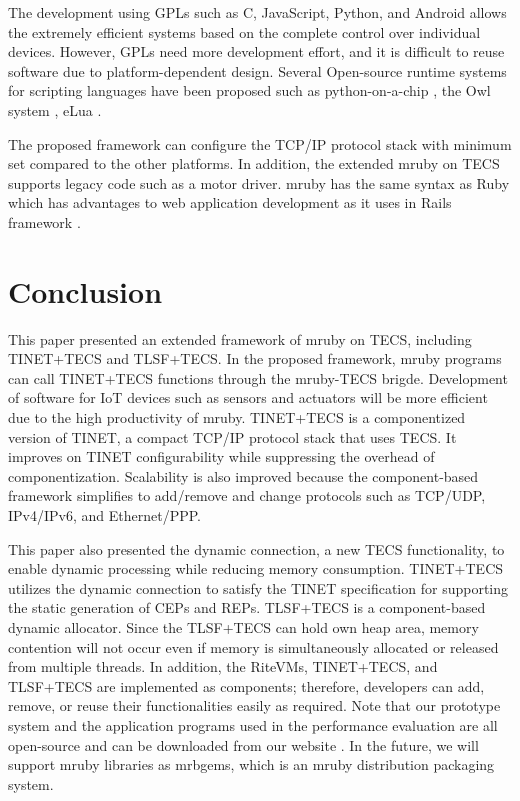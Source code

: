 \documentclass[JIP]{ipsj_v2/UTF8/ipsj}
\begin{document}
The development using GPLs such as C, JavaScript, Python, and Android allows the extremely efficient systems based on the complete control over individual devices.
However, GPLs need more development effort, and it is difficult to reuse software due to platform-dependent design.
Several Open-source runtime systems for scripting languages have been proposed such as python-on-a-chip \cite{url:python-on-a-chip}, the Owl system \cite{par:owl}, eLua \cite{url:eLua}.

The proposed framework can configure the TCP/IP protocol stack with minimum set compared to the other platforms.
In addition, the extended mruby on TECS supports legacy code such as a motor driver.
mruby has the same syntax as Ruby which has advantages to web application development as it uses in Rails framework \cite{url:rubyonrails}.



\section{Conclusion}
\label{sec:Conclusion}

This paper presented an extended framework of mruby on TECS, including TINET+TECS and TLSF+TECS.
In the proposed framework, mruby programs can call TINET+TECS functions through the mruby-TECS brigde.
Development of software for IoT devices such as sensors and actuators will be more efficient due to the high productivity of mruby.
TINET+TECS is a componentized version of TINET, a compact TCP/IP protocol stack that uses TECS.
It improves on TINET configurability while suppressing the overhead of componentization.
Scalability is also improved because the component-based framework simplifies to add/remove and change protocols such as TCP/UDP, IPv4/IPv6, and Ethernet/PPP.

This paper also presented the dynamic connection, a new TECS functionality, to enable dynamic processing while reducing memory consumption.
TINET+TECS utilizes the dynamic connection to satisfy the TINET specification for supporting the static generation of CEPs and REPs.
TLSF+TECS is a component-based dynamic allocator.
Since the TLSF+TECS can hold own heap area, memory contention will not occur even if memory is simultaneously allocated or released from multiple threads.
In addition, the RiteVMs, TINET+TECS, and TLSF+TECS are implemented as components; therefore, developers can add, remove, or reuse their functionalities easily as required.
Note that our prototype system and the application programs used in the performance evaluation are all open-source and can be downloaded from our website \cite{url:TECS}.
In the future, we will support mruby libraries as mrbgems, which is an mruby distribution packaging system.\newline
\end{document}
